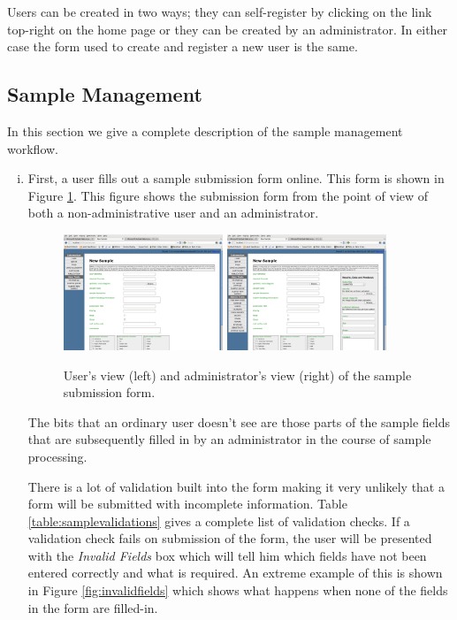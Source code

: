 \documentclass[12pt]{article}
\begin{document}
Users can be created in two ways; they can self-register by clicking
on the link top-right on the home page or they can be created by an
administrator. In either case the form used to create and register a new
user is the same.

\subsection{Sample Management}

In this section we give a complete description of the sample management
workflow.
\begin{enumerate}[(i)]
\item
First, a user fills out a sample submission form online. This form is
shown in Figure \ref{fig:sampleform}. This figure shows the
submission form from the point of view of both a non-administrative user
and an administrator.
\begin{figure}[!h]
\begin{center}
\includegraphics[width=0.45\textwidth]{sampleformuser}
\quad
\includegraphics[width=0.45\textwidth]{sampleformadmin}
\caption{User's view (left) and administrator's view (right)
of the sample submission form.\label{fig:sampleform}}
\end{center}
\end{figure}

The bits that an ordinary user doesn't see are those parts of the sample
fields that are subsequently filled in by an administrator in the course
of sample processing.

There is a lot of validation built into the form making it very unlikely
that a form will be submitted with incomplete information.
Table \ref{table:samplevalidations} gives a complete list of
validation checks. If a validation check fails on submission of the form,
the user will be presented with the \emph{Invalid Fields} box which will
tell him which fields have not been entered correctly and what is
required. An extreme example of this is shown in Figure
\ref{fig:invalidfields} which shows what happens when none of the fields
in the form are filled-in.


\end{enumerate}
\end{document}
